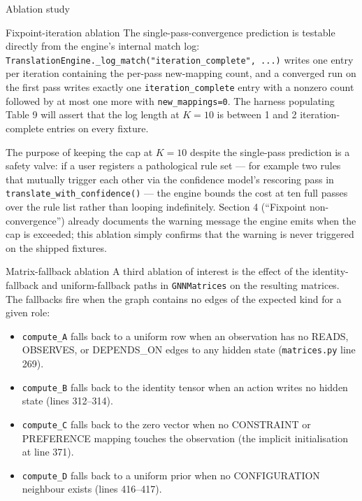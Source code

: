 \documentclass[
  ignorenonframetext,
]{beamer}
\providecommand{\tightlist}{%
  \setlength{\itemsep}{0pt}\setlength{\parskip}{0pt}}
\begin{document}
\begin{frame}[fragile]{Ablation study}
\begin{block}{Fixpoint-iteration ablation}
The single-pass-convergence prediction is testable directly from the
engine's internal match log:
\texttt{TranslationEngine.\_log\_match("iteration\_complete",\ ...)}
writes one entry per iteration containing the per-pass new-mapping
count, and a converged run on the first pass writes exactly one
\texttt{iteration\_complete} entry with a nonzero count followed by at
most one more with \texttt{new\_mappings=0}. The harness populating
Table 9 will assert that the log length at \(K = 10\) is between 1 and 2
iteration-complete entries on every fixture.

The purpose of keeping the cap at \(K = 10\) despite the single-pass
prediction is a safety valve: if a user registers a pathological rule
set --- for example two rules that mutually trigger each other via the
confidence model's rescoring pass in
\texttt{translate\_with\_confidence()} --- the engine bounds the cost at
ten full passes over the rule list rather than looping indefinitely.
Section 4 (``Fixpoint non-convergence'') already documents the warning
message the engine emits when the cap is exceeded; this ablation simply
confirms that the warning is never triggered on the shipped fixtures.
\end{block}

\begin{block}{Matrix-fallback ablation}
\protect{}\label{matrix-fallback-ablation}
A third ablation of interest is the effect of the identity-fallback and
uniform-fallback paths in \texttt{GNNMatrices} on the resulting
matrices. The fallbacks fire when the graph contains no edges of the
expected kind for a given role:

\begin{itemize}
\tightlist
\item
  \texttt{compute\_A} falls back to a uniform row when an observation
  has no READS, OBSERVES, or DEPENDS\_ON edges to any hidden state
  (\texttt{matrices.py} line 269).
\item
  \texttt{compute\_B} falls back to the identity tensor when an action
  writes no hidden state (lines 312--314).
\item
  \texttt{compute\_C} falls back to the zero vector when no CONSTRAINT
  or PREFERENCE mapping touches the observation (the implicit
  initialisation at line 371).
\item
  \texttt{compute\_D} falls back to a uniform prior when no
  CONFIGURATION neighbour exists (lines 416--417).
\end{itemize}


\end{block}
\end{frame}
\end{document}
